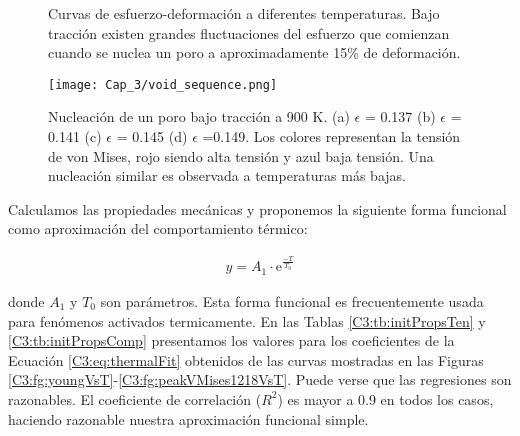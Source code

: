 
\begin{figure}[htp]
\centering
{}
\caption[Curvas de esfuerzo-deformación a diferentes temperaturas.]{Curvas de esfuerzo-deformación a diferentes temperaturas. Bajo tracción existen grandes fluctuaciones del esfuerzo que comienzan cuando se nuclea un poro a aproximadamente 15\% de deformación.}
\label{C3:fg:sStrain}
\end{figure}

\begin{figure}[htp]
\centering
\texttt{[image: Cap\_3/void\_sequence.png]}
\caption[Nucleación de un poro bajo tracción a 900 K.]{Nucleación de un poro bajo tracción a 900 K. (a) $\epsilon$ = 0.137 (b) $\epsilon$ = 0.141 (c) $\epsilon$ = 0.145 (d) $\epsilon$ =0.149. Los colores representan la tensión de von Mises, rojo siendo alta tensión y azul baja tensión. Una nucleación similar es observada a temperaturas más bajas.}
\label{C3:fg:voidSeq}
\end{figure}

Calculamos las propiedades mecánicas y proponemos la siguiente forma funcional como aproximación del comportamiento térmico:


\begin{eqnarray}
y = A_{1}\cdot \mathrm{e}^{\frac{-T}{T_{0}}}
\label{C3:eq:thermalFit}
\end{eqnarray}

donde $A_{1}$ y $T_{0}$ son parámetros. Esta forma funcional es frecuentemente usada para fenómenos activados termicamente. En las Tablas \ref{C3:tb:initPropsTen} y \ref{C3:tb:initPropsComp} presentamos los valores para los coeficientes de la Ecuación \ref{C3:eq:thermalFit} obtenidos de las curvas mostradas en las Figuras \ref{C3:fg:youngVsT}-\ref{C3:fg:peakVMises1218VsT}. Puede verse que las regresiones son razonables. El coeficiente de correlación ($R^2$) es mayor a 0.9 en todos los casos, haciendo razonable nuestra aproximación funcional simple.
	
